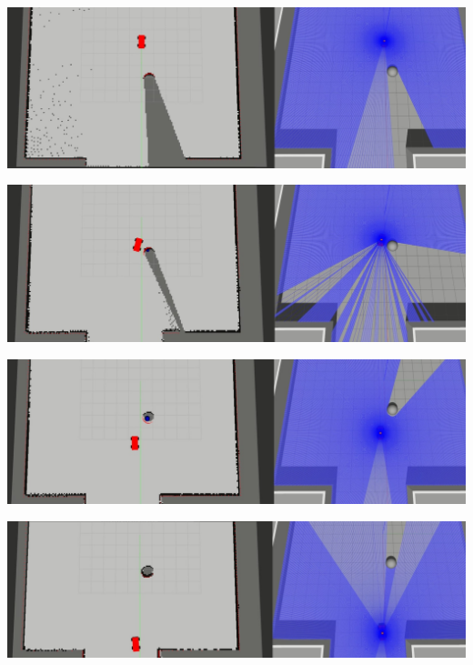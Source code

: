 \begin{minipage}{\textwidth}
    \includegraphics[width=\textwidth]{figures/raw/jpeg/local_planner_test_straight_traj_static_obj_1.jpg}

    \vspace{0.5cm}
    \includegraphics[width=\textwidth]{figures/raw/jpeg/local_planner_test_straight_traj_static_obj_2.jpg}

    \vspace{0.5cm}
    \includegraphics[width=\textwidth]{figures/raw/jpeg/local_planner_test_straight_traj_static_obj_3.jpg}

    \vspace{0.5cm}
    \includegraphics[width=\textwidth]{figures/raw/jpeg/local_planner_test_straight_traj_static_obj_4.jpg}

    \label{local_planner_test_straight_traj_static_obj}
\end{minipage}

